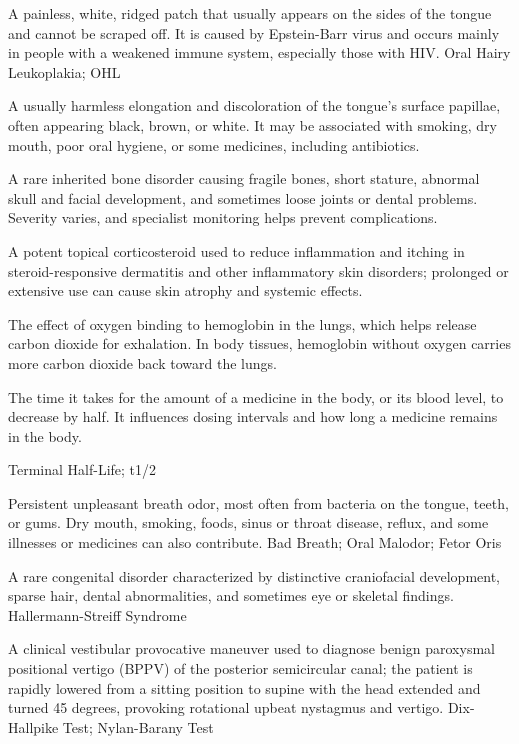  A painless, white, ridged patch that usually appears on the sides of the tongue and cannot be scraped off. It is caused by Epstein-Barr virus and occurs mainly in people with a weakened immune system, especially those with HIV.
\synonyms
Oral Hairy Leukoplakia; OHL

 A usually harmless elongation and discoloration of the tongue's surface papillae, often appearing black, brown, or white. It may be associated with smoking, dry mouth, poor oral hygiene, or some medicines, including antibiotics.

 A rare inherited bone disorder causing fragile bones, short stature, abnormal skull and facial development, and sometimes loose joints or dental problems. Severity varies, and specialist monitoring helps prevent complications.

 A potent topical corticosteroid used to reduce inflammation and itching in steroid-responsive dermatitis and other inflammatory skin disorders; prolonged or extensive use can cause skin atrophy and systemic effects.

 The effect of oxygen binding to hemoglobin in the lungs, which helps release carbon dioxide for exhalation. In body tissues, hemoglobin without oxygen carries more carbon dioxide back toward the lungs.

 The time it takes for the amount of a medicine in the body, or its blood level, to decrease by half. It influences dosing intervals and how long a medicine remains in the body.

\synonyms
Terminal Half-Life; t1/2

 Persistent unpleasant breath odor, most often from bacteria on the tongue, teeth, or gums. Dry mouth, smoking, foods, sinus or throat disease, reflux, and some illnesses or medicines can also contribute.
\synonyms
Bad Breath; Oral Malodor; Fetor Oris

 A rare congenital disorder characterized by distinctive craniofacial development, sparse hair, dental abnormalities, and sometimes eye or skeletal findings.
\synonyms
Hallermann-Streiff Syndrome

 A clinical vestibular provocative maneuver used to diagnose benign paroxysmal positional vertigo (BPPV) of the posterior semicircular canal; the patient is rapidly lowered from a sitting position to supine with the head extended and turned 45 degrees, provoking rotational upbeat nystagmus and vertigo.
\synonyms
Dix-Hallpike Test; Nylan-Barany Test

